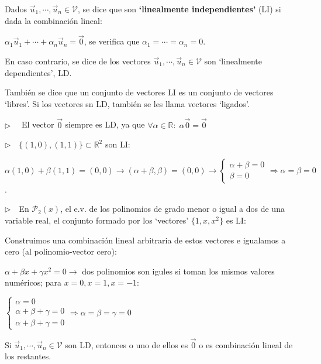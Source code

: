 \begin{definition}

Dados $\vec u_1, \cdots, \vec u_n \in \mathcal V$, se dice que son \textbf{`linealmente independientes'} (LI)	si dada la combinación lineal:

$\alpha_1 \vec u_1 + \cdots + \alpha_n \vec u_n=\vec 0$, se verifica que $\alpha_1= \cdots =\alpha_n=0$. 

En caso contrario, se dice de los vectores $\vec u_1, \cdots, \vec u_n \in \mathcal V$ son `linealmente dependientes', LD.  
\end{definition}

También se dice que un conjunto de vectores LI es un conjunto de vectores `libres'. Si los vectores sn LD, también se les llama vectores `ligados'.

\begin{cuadro-gris}
$\triangleright \quad$ El vector $\vec 0$ siempre es LD, ya que $\forall \alpha \in \mathbb R:\; \alpha \vec 0 = \vec 0$	

$\triangleright \quad$$\{(1,0), (1,1)\} \subset \mathbb R^2$ son LI:

\noindent \small{$\alpha (1,0) + \beta (1,1) = (0,0) \to (\alpha+\beta, \beta)=(0,0) \to \begin{cases} \alpha + \beta =0\\ \beta=0 \end{cases} \Rightarrow \alpha=\beta=0$	}\normalsize{.}

$\triangleright \quad$En $\mathcal P_2(x)$, el e.v. de los polinomios de grado menor o igual a dos de una variable real, el conjunto formado por los `vectores' $\{ 1,x,x^2 \}$ es LI:

Construimos una combinación lineal arbitraria de estos vectores e igualamos a cero (al polinomio-vector cero):	

$\alpha + \beta x + \gamma x^2 =0 \to $ dos polinomios son igules si toman los mismos valores numéricos; para $x=0, x=1, x=-1:$

$\begin{cases} \alpha=0\\ \alpha+\beta+\gamma=0 \\ \alpha+\beta+\gamma=0 \end{cases} \Rightarrow \alpha=\beta=\gamma=0$

\end{cuadro-gris}


\begin{theorem}
	
	Si $\vec u_1, \cdots, \vec u_n \in \mathcal V$ son LD, entonces o uno de ellos es $\vec 0$ o es combinación lineal de los restantes.
\end{theorem}

